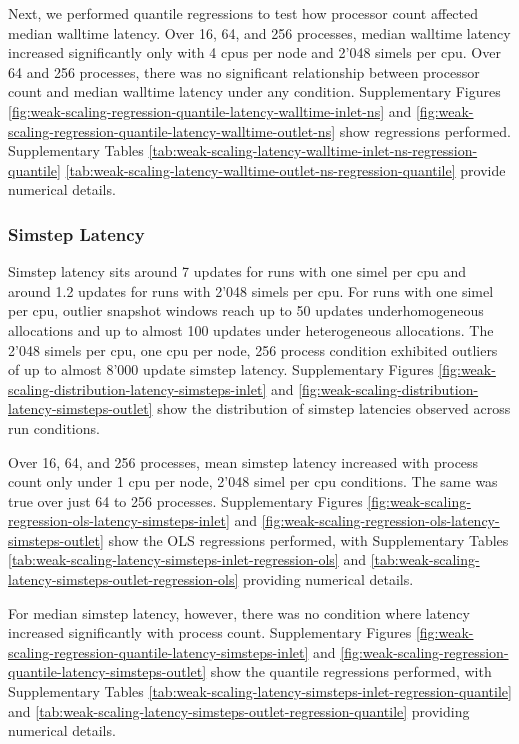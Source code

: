 Next, we performed quantile regressions to test how processor count affected median walltime latency.
Over 16, 64, and 256 processes, median walltime latency increased significantly only with 4 cpus per node and 2'048 simels per cpu.
Over 64 and 256 processes, there was no significant relationship between processor count and median walltime latency under any condition.
Supplementary Figures \ref{fig:weak-scaling-regression-quantile-latency-walltime-inlet-ns} and \ref{fig:weak-scaling-regression-quantile-latency-walltime-outlet-ns} show regressions performed.
Supplementary Tables \ref{tab:weak-scaling-latency-walltime-inlet-ns-regression-quantile} \ref{tab:weak-scaling-latency-walltime-outlet-ns-regression-quantile} provide numerical details.

\subsubsection{Simstep Latency}

Simstep latency sits around 7 updates for runs with one simel per cpu and around 1.2 updates for runs with 2'048 simels per cpu.
For runs with one simel per cpu, outlier snapshot windows reach up to 50 updates underhomogeneous allocations and up to almost 100 updates under heterogeneous allocations.
The 2'048 simels per cpu, one cpu per node, 256 process condition exhibited outliers of up to almost 8'000 update simstep latency.
Supplementary Figures \ref{fig:weak-scaling-distribution-latency-simsteps-inlet} and \ref{fig:weak-scaling-distribution-latency-simsteps-outlet}  show the distribution of simstep latencies observed across run conditions.

Over 16, 64, and 256 processes, mean simstep latency increased with process count only under 1 cpu per node, 2'048 simel per cpu conditions.
The same was true over just 64 to 256 processes.
Supplementary Figures \ref{fig:weak-scaling-regression-ols-latency-simsteps-inlet} and \ref{fig:weak-scaling-regression-ols-latency-simsteps-outlet} show the OLS regressions performed, with
Supplementary Tables \ref{tab:weak-scaling-latency-simsteps-inlet-regression-ols} and \ref{tab:weak-scaling-latency-simsteps-outlet-regression-ols} providing numerical details.

For median simstep latency, however, there was no condition where latency increased significantly with process count.
Supplementary Figures \ref{fig:weak-scaling-regression-quantile-latency-simsteps-inlet} and \ref{fig:weak-scaling-regression-quantile-latency-simsteps-outlet} show the quantile regressions performed, with Supplementary Tables \ref{tab:weak-scaling-latency-simsteps-inlet-regression-quantile} and \ref{tab:weak-scaling-latency-simsteps-outlet-regression-quantile} providing numerical details.

